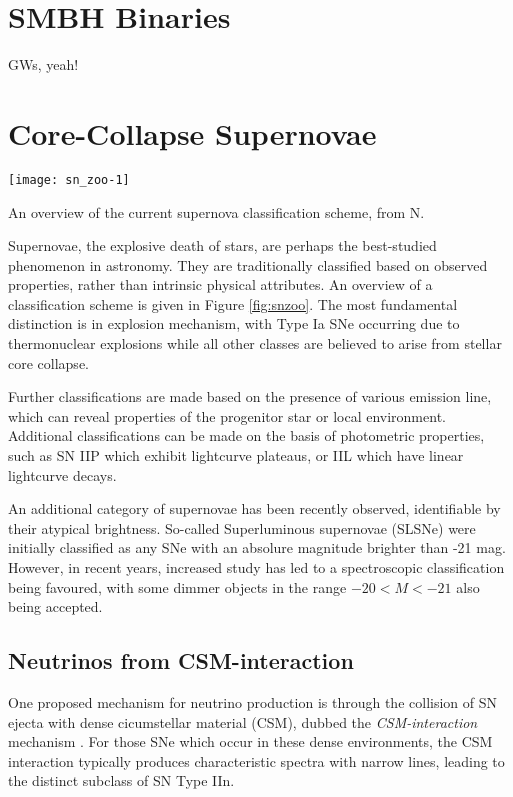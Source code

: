 \section{SMBH Binaries}

GWs, yeah!

\section{Core-Collapse Supernovae}
\label{sec:ccsn}

\begin{marginfigure}
	\texttt{[image: sn\_zoo-1]}
	\caption{An overview of the current supernova classification scheme, from N.}
	\label{fig:snzoo}
\end{marginfigure}

Supernovae, the explosive death of stars, are perhaps the best-studied phenomenon in astronomy. They are traditionally classified based on observed properties, rather than intrinsic physical attributes. An overview of a classification scheme is given in Figure \ref{fig:snzoo}. The most fundamental distinction is in explosion mechanism, with Type Ia SNe occurring due to thermonuclear explosions while all other classes are believed to arise from stellar core collapse. 

Further classifications are made based on the presence of various emission line, which can reveal properties of the progenitor star or local environment. Additional classifications can be made on the basis of photometric properties, such as SN IIP which exhibit lightcurve plateaus, or IIL which have linear lightcurve decays. 

An additional category of supernovae has been recently observed, identifiable by their atypical brightness. So-called Superluminous supernovae (SLSNe) were initially classified as any SNe with an absolure magnitude brighter than -21 mag. However, in recent years, increased study has led to a spectroscopic classification being favoured, with some dimmer objects in the range $-20 < M < -21$ also being accepted. 

\subsection{Neutrinos from CSM-interaction}

One proposed mechanism for neutrino production is through the collision of SN ejecta with dense cicumstellar material (CSM), dubbed the \emph{CSM-interaction} mechanism . For those SNe which occur in these dense environments, the CSM interaction typically produces characteristic spectra with narrow lines, leading to the distinct subclass of SN Type IIn. 

